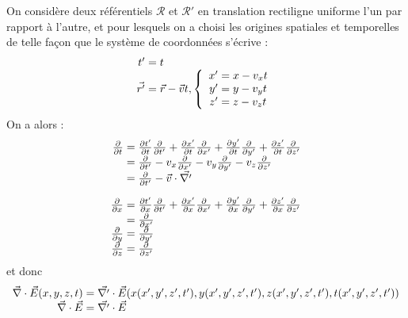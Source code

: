 On considère deux référentiels $\mathcal{R}$ et $\mathcal{R}'$ en translation rectiligne uniforme l'un par rapport à l'autre, et pour lesquels on a choisi les origines spatiales et temporelles de telle façon que le système de coordonnées s'écrive :
$$
	\begin{array}{r@{\;}l}
		t'&=t\\
		\vec{r'}&=\vec{r}-\vec{v}t, \left\{ \begin{array}{r@{\;}l}
				x'&=x-v_{x}t \\
				y'&=y-v_{y}t \\
				z'&=z-v_{z}t \\
			\end{array} \right.
	\end{array}
$$
On a alors :
$$
	\begin{array}{r@{\;}l}
		\frac{\partial}{\partial t}&=\frac{\partial t'}{\partial t} \frac{\partial}{\partial t'}
				+\frac{\partial x'}{\partial t} \frac{\partial}{\partial x'}
				+\frac{\partial y'}{\partial t} \frac{\partial}{\partial y'}
				+\frac{\partial z'}{\partial t} \frac{\partial}{\partial z'}\\
		&=\frac{\partial}{\partial t'} - v_{x} \frac{\partial}{\partial x'}
				- v_{y} \frac{\partial}{\partial y'}
				- v_{z} \frac{\partial}{\partial z'}\\
		&=\frac{\partial}{\partial t'} - \vec{v}\cdot \vec{\nabla '}\\[10pt]
		\frac{\partial}{\partial x}&=\frac{\partial t'}{\partial x} \frac{\partial}{\partial t'}
				+\frac{\partial x'}{\partial x} \frac{\partial}{\partial x'}
				+\frac{\partial y'}{\partial x} \frac{\partial}{\partial y'}
				+\frac{\partial z'}{\partial x} \frac{\partial}{\partial z'}\\
		&=\frac{\partial}{\partial x'}\\
		\frac{\partial}{\partial y}&=\frac{\partial}{\partial y'}\\
		\frac{\partial}{\partial z}&=\frac{\partial}{\partial z'}
	\end{array}
$$
et donc 
$$
	\begin{array}{r@{\;}l}
		\nab\cdot\vec{E}(x,y,z,t)&=\vec{\nabla '}\cdot\vec{E}(x(x',y',z',t'),y(x',y',z',t'),z(x',y',z',t'),t(x',y',z',t'))\\ 
		\nab\cdot\vec{E}&=\vec{\nabla '}\cdot\vec{E}
	\end{array}
$$
